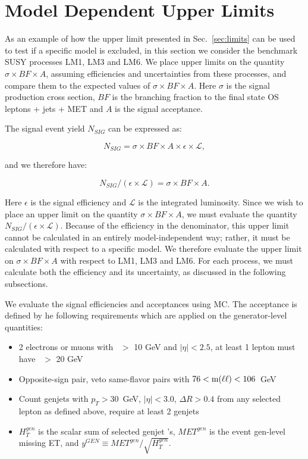 \section{Model Dependent Upper Limits}
\label{sec:sigmalimit}

As an example of how the upper limit presented in Sec.~\ref{sec:limits} can be
used to test if a specific model is excluded, in this section we consider the benchmark
SUSY processes LM1, LM3 and LM6.
We place upper limits on the quantity $\sigma \times BF \times A$,
assuming efficiencies and uncertainties from these processes, and compare them to 
the expected values of $\sigma \times BF \times A$.
Here $\sigma$ is the signal production cross section, $BF$ is the branching fraction
to the final state OS leptons + jets + MET and $A$ is the signal acceptance.

The signal event yield $N_{SIG}$ can be expressed as:

\begin{equation}
N_{SIG} = \sigma \times BF \times A \times \epsilon \times \mathcal{L},
\end{equation}

and we therefore have:

\begin{equation}
N_{SIG}/( \epsilon \times \mathcal{L}) = \sigma \times BF \times A.
\end{equation}

Here  $\epsilon$ is the signal efficiency and $\mathcal{L}$ is the integrated luminosity. 
Since we wish to place an upper limit on the quantity $\sigma \times BF \times A$, we must evaluate
the quantity $N_{SIG}/(\epsilon \times \mathcal{L})$.  Because of the efficiency
in the denominator, this upper limit cannot be calculated in an entirely model-independent
way; rather, it must be calculated with respect to a specific model. We therefore evaluate
the upper limit on $\sigma \times BF \times A$ with respect to LM1, LM3 and LM6.  
For each process, we must calculate both the efficiency and its uncertainty, as discussed
in the following subsections.

We evaluate the signal efficiencies and acceptances using MC. The acceptance is defined by he
following requirements which are applied on the generator-level quantities:

\begin{itemize}
\item 2 electrons or muons with \pt\ $>$ 10 GeV and $|\eta|<2.5$, at least 1 lepton must have \pt\ $>$ 20 GeV
\item Opposite-sign pair, veto same-flavor pairs with $76 < \rm{m(\ell\ell)} < 106$~GeV
\item Count genjets with $p_T > 30$~GeV, $|\eta|<3.0$, $\Delta R > 0.4$ from any selected lepton as defined above, require at least 2 genjets
\item $H_{T}^{gen}$ is the scalar sum of selected genjet \pt's, $MET^{gen}$ is the event gen-level missing ET, and $y^{GEN} \equiv MET^{gen}/\sqrt{H_{T}^{gen}}$.
\end{itemize}


